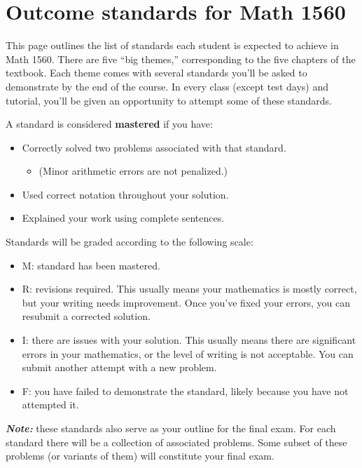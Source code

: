 \documentclass[10pt,]{article}
\newcommand{\alert}[1]{\textbf{\textit{#1}}}
\newcommand{\terminology}[1]{\textbf{#1}}
\begin{document}
\section[{Outcome standards for Math 1560}]{Outcome standards for Math 1560}\label{section-standards}
\hypertarget{p-46}{}%
This page outlines the list of standards each student is expected to achieve in Math 1560. There are five ``big themes,'' corresponding to the five chapters of the textbook. Each theme comes with several standards you'll be asked to demonstrate by the end of the course. In every class (except test days) and tutorial, you'll be given an opportunity to attempt some of these standards.%
\par
\hypertarget{p-47}{}%
A standard is considered \terminology{mastered} if you have: \leavevmode%
\begin{itemize}[label=\textbullet]
\item{}\hypertarget{p-48}{}%
Correctly solved two problems associated with that standard. %
\begin{itemize}[label=]
\item{}(Minor arithmetic errors are not penalized.)%
\end{itemize}
%
\item{}Used correct notation throughout your solution.%
\item{}Explained your work using complete sentences.%
\end{itemize}
%
\par
\hypertarget{p-49}{}%
Standards will be graded according to the following scale: \leavevmode%
\begin{itemize}[label=\textbullet]
\item{}M: standard has been mastered.%
\item{}R: revisions required. This usually means your mathematics is mostly correct, but your writing needs improvement. Once you've fixed your errors, you can resubmit a corrected solution.%
\item{}I: there are issues with your solution. This usually means there are significant errors in your mathematics, or the level of writing is not acceptable. You can submit another attempt with a new problem.%
\item{}F: you have failed to demonstrate the standard, likely because you have not attempted it.%
\end{itemize}
%
\par
\hypertarget{p-50}{}%
\alert{Note:} these standards also serve as your outline for the final exam. For each standard there will be a collection of associated problems. Some subset of these problems (or variants of them) will constitute your final exam.%
\end{document}
